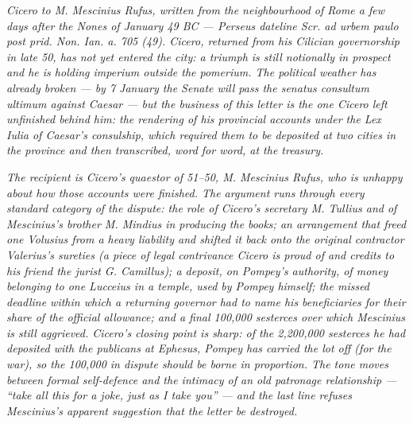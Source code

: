 
\textit{Cicero to M. Mescinius Rufus, written from the
neighbourhood of Rome a few days after the Nones of January 49
BC --- Perseus dateline \textit{Scr. ad urbem paulo post prid.
Non. Ian. a. 705 (49)}. Cicero, returned from his Cilician
governorship in late 50, has not yet entered the city: a
triumph is still notionally in prospect and he is holding
\textit{imperium} outside the pomerium. The political weather
has already broken --- by 7 January the Senate will pass the
\textit{senatus consultum ultimum} against Caesar --- but the
business of this letter is the one Cicero left unfinished
behind him: the rendering of his provincial accounts under the
Lex Iulia of Caesar's consulship, which required them to be
deposited at two cities in the province and then transcribed,
word for word, at the treasury.}

\textit{The recipient is Cicero's quaestor of 51--50, M.
Mescinius Rufus, who is unhappy about how those accounts were
finished. The argument runs through every standard category of
the dispute: the role of Cicero's secretary M. Tullius and of
Mescinius's brother M. Mindius in producing the books; an
arrangement that freed one Volusius from a heavy liability and
shifted it back onto the original contractor Valerius's
sureties (a piece of legal contrivance Cicero is proud of and
credits to his friend the jurist G. Camillus); a deposit, on
Pompey's authority, of money belonging to one Lucceius in a
temple, used by Pompey himself; the missed deadline within
which a returning governor had to name his beneficiaries for
their share of the official allowance; and a final 100{,}000
sesterces over which Mescinius is still aggrieved. Cicero's
closing point is sharp: of the 2{,}200{,}000 sesterces he had
deposited with the publicans at Ephesus, Pompey has carried
the lot off (for the war), so the 100{,}000 in dispute should
be borne in proportion. The tone moves between formal
self-defence and the intimacy of an old patronage relationship
--- ``take all this for a joke, just as I take you'' --- and
the last line refuses Mescinius's apparent suggestion that the
letter be destroyed.}
